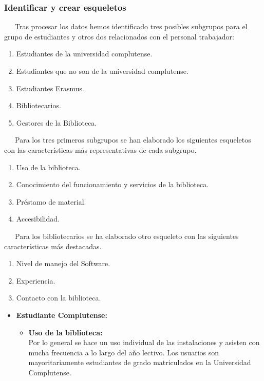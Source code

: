 \documentclass[12pt]{article}
\begin{document}
\begin{itemize}
\subsubsection{Identificar y crear esqueletos}

~~~Tras procesar los datos hemos identificado tres posibles subgrupos para el grupo de estudiantes y otros dos relacionados con el personal trabajador:
\begin{enumerate}
	\item Estudiantes de la universidad complutense.
	\item Estudiantes que no son de la universidad complutense.
	\item Estudiantes Erasmus.
	\item Bibliotecarios.
	\item Gestores de la Biblioteca.
\end{enumerate}

~~~Para los tres primeros subgrupos se han elaborado los siguientes esqueletos con las características más representativas de cada subgrupo.

\begin{enumerate}
	\item Uso de la biblioteca.
	\item Conocimiento del funcionamiento y servicios de la biblioteca.
	\item Préstamo de material.
	\item Accesibilidad.
\end{enumerate}

~~~Para los bibliotecarios se ha elaborado otro esqueleto con las siguientes características más destacadas.

\begin{enumerate}
	\item Nivel de manejo del Software.
	\item Experiencia.
	\item Contacto con la biblioteca.
\end{enumerate}

\begin{itemize}
	\item \textbf{Estudiante Complutense: }
	\begin{itemize}
		\item \textbf{Uso de la biblioteca: \\}
			Por lo general se hace un uso individual de las instalaciones y asisten con mucha frecuencia a lo largo del año lectivo. Los usuarios son mayoritariamente estudiantes de grado matriculados en la Universidad Complutense.


\end{itemize}
\end{itemize}
\end{itemize}
\end{document}
